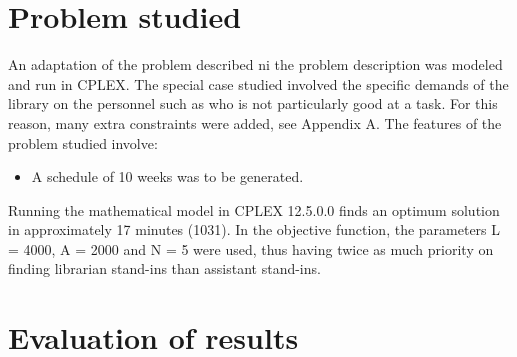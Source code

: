 
\section{Problem studied}

An adaptation of the problem described ni the problem description was modeled and run in CPLEX. The special case studied involved the specific demands of the library on the personnel such as who is not particularly good at a task. For this reason, many extra constraints were added, see Appendix A. The features of the problem studied involve:


\begin{itemize}
\item A schedule of 10 weeks was to be generated.
\end{itemize}


Running the mathematical model in CPLEX 12.5.0.0 finds an optimum solution in approximately 17 minutes (1031). In the objective function, the parameters L = 4000, A = 2000 and N = 5 were used, thus having twice as much priority on finding librarian stand-ins than assistant stand-ins.
 

\iffalse
Other parameters include:

\begin{itemize}
\item the number of allowed PL per week, which was one
\item the number of allowed PL in 10 weeks, which was three
\item the number of tasks which can be placed on the same shift time during a week, which was two
\end{itemize}
\fi



\section{Evaluation of results}


